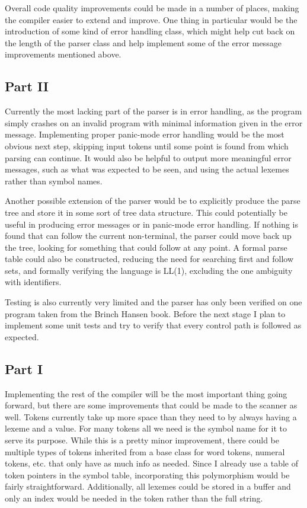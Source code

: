 \documentclass{article}
\begin{document}
        Overall code quality improvements could be made in a number of places, making the compiler easier to extend and improve. One thing in particular would be the introduction of some kind of error handling class, which might help cut back on the length of the parser class and help implement some of the error message improvements mentioned above.

        \subsection{Part II}

        Currently the most lacking part of the parser is in error handling, as the program simply crashes on an invalid program with minimal information given in the error message. Implementing proper panic-mode error handling would be the most obvious next step, skipping input tokens until some point is found from which parsing can continue. It would also be helpful to output more meaningful error messages, such as what was expected to be seen, and using the actual lexemes rather than symbol names. 

        Another possible extension of the parser would be to explicitly produce the parse tree and store it in some sort of tree data structure. This could potentially be useful in producing error messages or in panic-mode error handling. If nothing is found that can follow the current non-terminal, the parser could move back up the tree, looking for something that could follow at any point. A formal parse table could also be constructed, reducing the need for searching first and follow sets, and formally verifying the language is LL(1), excluding the one ambiguity with identifiers.

        Testing is also currently very limited and the parser has only been verified on one program taken from the Brinch Hansen book. Before the next stage I plan to implement some unit tests and try to verify that every control path is followed as expected. 

        \subsection{Part I}

        Implementing the rest of the compiler will be the most important thing going forward, but there are some improvements that could be made to the scanner as well. Tokens currently take up more space than they need to by always having a lexeme and a value. For many tokens all we need is the symbol name for it to serve its purpose. While this is a pretty minor improvement, there could be multiple types of tokens inherited from a base class for word tokens, numeral tokens, etc. that only have as much info as needed. Since I already use a table of token pointers in the symbol table, incorporating this polymorphism would be fairly straightforward. Additionally, all lexemes could be stored in a buffer and only an index would be needed in the token rather than the full string.
\end{document}
